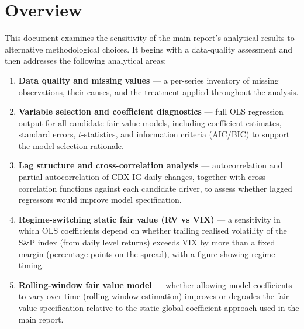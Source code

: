 \section{Overview}

This document examines the sensitivity of the main report's analytical results
to alternative methodological choices. It begins with a data-quality assessment
and then addresses the following analytical areas:

\begin{enumerate}
  \item \textbf{Data quality and missing values} --- a per-series inventory of
    missing observations, their causes, and the treatment applied throughout
    the analysis.
  \item \textbf{Variable selection and coefficient diagnostics} --- full OLS
    regression output for all candidate fair-value models, including coefficient
    estimates, standard errors, \(t\)-statistics, and information criteria
    (AIC/BIC) to support the model selection rationale.
  \item \textbf{Lag structure and cross-correlation analysis} --- autocorrelation
    and partial autocorrelation of CDX IG daily changes, together with
    cross-correlation functions against each candidate driver, to assess whether
    lagged regressors would improve model specification.
  \item \textbf{Regime-switching static fair value (RV vs VIX)} --- a
    sensitivity in which OLS coefficients depend on whether trailing realised
    volatility of the S\&P index (from daily level returns) exceeds VIX by more
    than a fixed margin (percentage points on the spread), with a
    figure showing regime timing.
  \item \textbf{Rolling-window fair value model} --- whether allowing model
    coefficients to vary over time (rolling-window estimation) improves or
    degrades the fair-value specification relative to the static
    global-coefficient approach used in the main report.
\end{enumerate}
